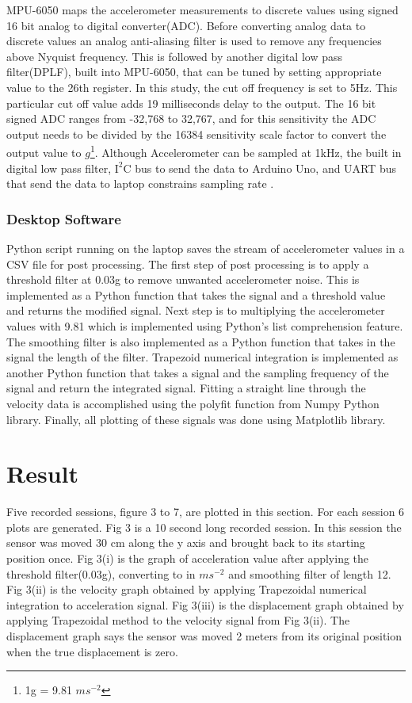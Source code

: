 \documentclass{article}
\begin{document}
MPU-6050 maps the accelerometer measurements to discrete values using signed 16 bit analog to digital converter(ADC). Before converting analog data to discrete values an analog anti-aliasing filter is used to remove any frequencies above Nyquist frequency. This is followed by another digital low pass filter(DPLF), built into MPU-6050, that can be tuned by setting appropriate value to the 26th register. In this study, the cut off frequency is set to 5Hz. This particular cut off value adds 19 milliseconds delay to the output. The 16 bit signed ADC ranges from -32,768 to 32,767, and for this sensitivity the ADC output needs to be divided by the 16384 sensitivity scale factor to convert the output value to $g$\footnote{1g = 9.81 $ms^{-2}$}. Although Accelerometer can be sampled at 1kHz, the built in digital low pass filter, $\text{I}^2\text{C}$ bus to send the data to Arduino Uno, and UART bus that send the data to laptop constrains sampling rate \cite{invensense}.

\subsubsection{Desktop Software}
Python script running on the laptop saves the stream of accelerometer values in a CSV file for post processing. The first step of post processing is to apply a threshold filter at 0.03g to remove unwanted accelerometer noise. This is implemented as a Python function that takes the signal and a threshold value and returns the modified signal. Next step is to multiplying the accelerometer values with 9.81 which is implemented using Python's list comprehension feature. The smoothing filter is also implemented as a Python function that takes in the signal the length of the filter. Trapezoid numerical integration is implemented as another Python function that takes a signal and the sampling frequency of the signal and return the integrated signal. Fitting a straight line through the velocity data is accomplished using the polyfit function from Numpy Python library. Finally, all plotting of these signals was done using Matplotlib library. 

\section{Result}
Five recorded sessions, figure 3 to 7, are plotted in this section. For each session 6 plots are generated. Fig 3 is a 10 second long recorded session. In this session the sensor was moved 30 cm along the y axis and brought back to its starting position once. Fig 3(i) is the graph of acceleration value after applying the threshold filter(0.03g), converting to in $ms^{-2}$ and smoothing filter of length 12. Fig 3(ii) is the velocity graph obtained by applying Trapezoidal numerical integration to acceleration signal. Fig 3(iii) is the displacement graph obtained by applying Trapezoidal method to the velocity signal from Fig 3(ii). The displacement graph says the sensor was moved 2 meters from its original position when the true displacement is zero.
\end{document}
